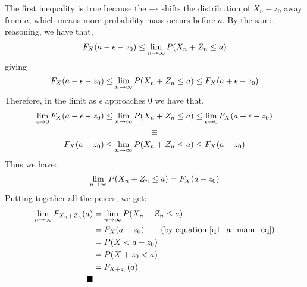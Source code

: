 The first inequality is true because the $-\epsilon$ shifts the distribution of $X_n - z_0$ away from $a$, which means more probability mass occurs before $a$.
By the same reasoning, we have that, 
\begin{align*}
        F_{X}(a - \epsilon - z_0) \leq  \underset{n\rightarrow \infty}{\lim}\, P(X_n + Z_n \leq a)  
\end{align*}
giving
\begin{equation*}
   F_{X}(a - \epsilon - z_0)   \leq  \underset{n\rightarrow \infty}{\lim}\, P(X_n + Z_n \leq a) \leq F_{X}(a + \epsilon - z_0)\\
\end{equation*}
Therefore, in the limit as $\epsilon$ approaches $0$ we have that,
\begin{gather*}
   \underset{\epsilon\rightarrow 0}{\lim}\, F_{X}(a - \epsilon - z_0) \leq  \underset{n\rightarrow \infty}{\lim}\, P(X_n + Z_n \leq a) \leq \underset{\epsilon\rightarrow 0}{\lim}\, F_{X}(a + \epsilon- z_0)\\
   \equiv\\
   F_{X}(a - z_0) \leq \underset{n\rightarrow \infty}{\lim}\, P(X_n + Z_n \leq a) \leq F_{X}(a - z_0)\\
\end{gather*}
Thus we have:
\begin{equation}
    \label{q1_a_main_eq}
            \underset{n\rightarrow \infty}{\lim}\, P(X_n + Z_n \leq a) =F_{X}(a-z_0)
\end{equation}
Putting together all the peices, we get:
\begin{align*}
    \limit{n}{\infty} F_{X_n + Z_n}( a) &= \limit{n}{\infty} P(X_n + Z_n \leq a)\\
                                        &=F_{X}(a-z_0)  \tag*{(by equation \ref{q1_a_main_eq})}\\
                                        &=P(X < a - z_0)\\ 
                                        &= P(X + z_0 <a )\\
                                        &=F_{X+ z_0}(a)\\
    \blacksquare
\end{align*}




